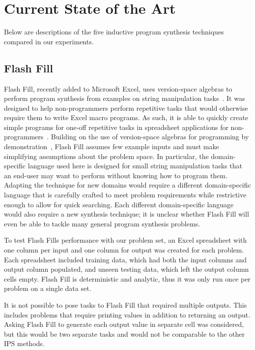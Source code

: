 \section{Current State of the Art}

Below are descriptions of the five inductive program synthesis techniques compared in our experiments.

\subsection{Flash Fill}

Flash Fill, recently added to Microsoft Excel, uses version-space algebras to perform program synthesis from examples on string manipulation tasks~\cite{Gulwani2011}. It was designed to help non-programmers perform repetitive tasks that would otherwise require them to write Excel macro programs. As such, it is able to quickly create simple programs for one-off repetitive tasks in spreadsheet applications for non-programmers~\cite{Gulwani:2012:SDM:2240236.2240260, harris2011spreadsheet, Singh:2012:LSS:2212351.2212356, singh2012synthesizing}. Building on the use of version-space algebras for programming by demonstration~\cite{lau2003programming}, Flash Fill assumes few example inputs and must make simplifying assumptions about the problem space. In particular, the domain-specific language used here is designed for small string manipulation tasks that an end-user may want to perform without knowing how to program them. Adapting the technique for new domains would require a different domain-specific language that is carefully crafted to meet problem requirements while restrictive enough to allow for quick searching. Each different domain-specific language would also require a new synthesis technique; it is unclear whether Flash Fill will even be able to tackle many general program synthesis problems.

To test Flash Fills performance with our problem set, an Excel spreadsheet with one column per input and one column for output was created for each problem. Each spreadsheet included training data, which had both the input columns and output column populated, and unseen testing data, which left the output column cells empty. Flash Fill is deterministic and analytic, thus it was only run once per problem on a single data set.

It is not possible to pose tasks to Flash Fill that required multiple outputs. This includes problems that require printing values in addition to returning an output. Asking Flash Fill to generate each output value in separate cell was considered, but this would be two separate tasks and would not be comparable to the other IPS methods.

